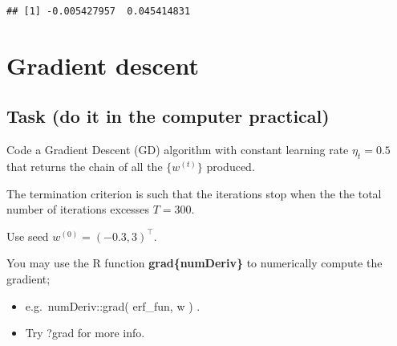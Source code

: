\documentclass[
]{article}
\begin{document}
\begin{verbatim}
## [1] -0.005427957  0.045414831
\end{verbatim}

\hypertarget{gradient-descent}{%
\section{Gradient descent}\label{gradient-descent}}

\hypertarget{task-do-it-in-the-computer-practical-2}{%
\subsection{Task (do it in the computer
practical)}\label{task-do-it-in-the-computer-practical-2}}

Code a Gradient Descent (GD) algorithm with constant learning rate
\(\eta_{t}=0.5\) that returns the chain of all the \(\{w^{(t)}\}\)
produced.

The termination criterion is such that the iterations stop when the the
total number of iterations excesses \(T=300\).

Use seed \(w^{(0)}=(-0.3,3)^\top\).

You may use the R function \textbf{grad\{numDeriv\}} to numerically
compute the gradient;

\begin{itemize}
\item
  e.g.~numDeriv::grad( erf\_fun, w ) .
\item
  Try ?grad for more info.
\end{itemize}
\end{document}
